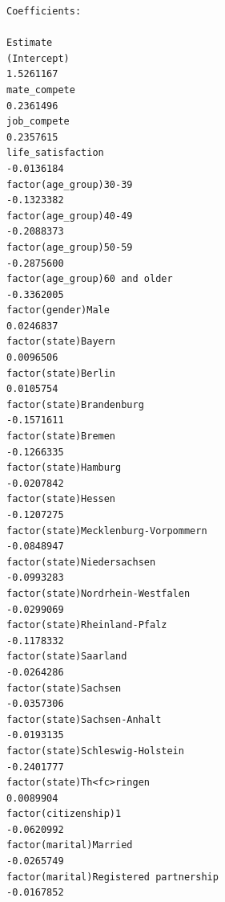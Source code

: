 \documentclass[
]{article}
\begin{document}
\begin{table}
\begin{minipage}[t]{\linewidth}
{\begin{verbatim}
Coefficients:
                                                                                    Estimate
(Intercept)                                                                        1.5261167
mate_compete                                                                       0.2361496
job_compete                                                                        0.2357615
life_satisfaction                                                                 -0.0136184
factor(age_group)30-39                                                            -0.1323382
factor(age_group)40-49                                                            -0.2088373
factor(age_group)50-59                                                            -0.2875600
factor(age_group)60 and older                                                     -0.3362005
factor(gender)Male                                                                 0.0246837
factor(state)Bayern                                                                0.0096506
factor(state)Berlin                                                                0.0105754
factor(state)Brandenburg                                                          -0.1571611
factor(state)Bremen                                                               -0.1266335
factor(state)Hamburg                                                              -0.0207842
factor(state)Hessen                                                               -0.1207275
factor(state)Mecklenburg-Vorpommern                                               -0.0848947
factor(state)Niedersachsen                                                        -0.0993283
factor(state)Nordrhein-Westfalen                                                  -0.0299069
factor(state)Rheinland-Pfalz                                                      -0.1178332
factor(state)Saarland                                                             -0.0264286
factor(state)Sachsen                                                              -0.0357306
factor(state)Sachsen-Anhalt                                                       -0.0193135
factor(state)Schleswig-Holstein                                                   -0.2401777
factor(state)Th<fc>ringen                                                          0.0089904
factor(citizenship)1                                                              -0.0620992
factor(marital)Married                                                            -0.0265749
factor(marital)Registered partnership                                             -0.0167852

\end{verbatim}}
\end{minipage}
\end{table}
\end{document}
